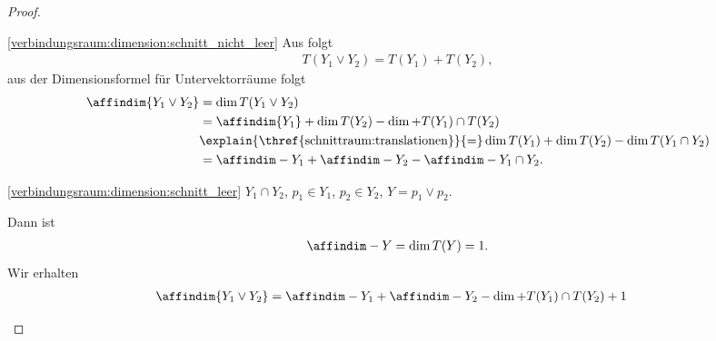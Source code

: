 \begin{proof}
    \begin{proofdescription}
        
        \item[\ref{verbindungsraum:dimension:schnitt_nicht_leer}] Aus  folgt
        \begin{align*}
            T(Y_1\vee Y_2)=T(Y_1)+T(Y_2),
        \end{align*}
        aus der Dimensionsformel für Untervektorräume folgt
        \begin{equation*}
            \affindim{Y_1\vee Y_2}\begin{aligned}[t] 
                &=\dim{T(Y_1\vee Y_2)}\\
                &=\affindim{Y_1}+\dim{T(Y_2)}-\dim+{T(Y_1)\cap T(Y_2)}\\
                &\explain{\text{\thref{schnittraum:translationen}}}{=}\dim{T(Y_1)}+\dim{T(Y_2)}-\dim{T(Y_1\cap Y_2)}\\
                &=\affindim-{Y_1}+\affindim-{Y_2}-\affindim-{Y_1\cap Y_2}.
            \end{aligned}
        \end{equation*}
        
        \item[\ref{verbindungsraum:dimension:schnitt_leer}] \( Y_1\cap Y_2 \), \( p_1\in Y_1 \), \( p_2\in Y_2 \), \( Y=p_1\vee p_2 \).
        
        Dann ist
        \begin{align*}
            \affindim-{Y}=\dim{T(Y)}=1.
        \end{align*}
        Wir erhalten
        \begin{align*}
            \affindim{Y_1\vee Y_2}\begin{aligned}[t] 
                &=\affindim-{Y_1}+\affindim-{Y_2} -\dim+{T(Y_1)\cap T(Y_2)}+1
            \end{aligned}
        \end{align*}
    \end{proofdescription}
\end{proof}
